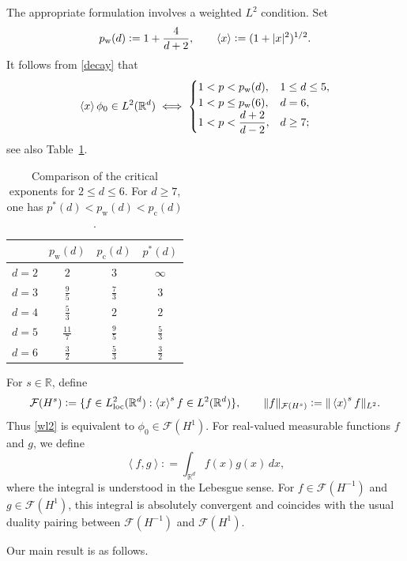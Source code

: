 \documentclass[12pt, a4paper, reqno]{amsart}
\numberwithin{equation}{section}
\theoremstyle{definition}
\theoremstyle{remark}
\newcommand{\R}{\mathbb R}
\newcommand{\cF}{\mathcal F}
\def\tbra[#1,#2]{{\left\langle #1,#2\right\rangle}}
\newcommand{\ce}{\mathrel{\mathop:}=}
\begin{document}
The appropriate formulation involves a weighted $L^2$ condition.
Set
\[
  p_{\mathrm w}(d)\ce1+\frac{4}{d+2},
  \qquad \braket{x}\ce(1+|x|^2)^{1/2}.
\]
It follows from \eqref{decay} that
\begin{align}
\label{wl2}
  \braket{x}\phi_0\in L^2(\R^d)
  \iff
  \begin{cases}
    1<p<p_{\mathrm w}(d), & 1\le d\le5,\\
    1<p\le p_{\mathrm w}(6), & d=6,\\
    1<p<\dfrac{d+2}{d-2}, & d\ge7;
  \end{cases}
\end{align}
see also Table~\ref{t-p}.
\begin{table}[t]
\centering
\begin{tabular}{c|ccc}
  & $p_{\mathrm w}(d)$ & $p_{\mathrm c}(d)$ & $p^*(d)$\\ \hline
  $d=2$ & $2$ & $3$ & $\infty$\\[1pt]
  $d=3$ & $\frac95$ & $\frac73$ & $3$\\[3pt]
  $d=4$ & $\frac53$ & $2$ & $2$\\[3pt]
  $d=5$ & $\frac{11}{7}$ & $\frac95$ & $\frac53$\\[3pt]
  $d=6$ & $\frac32$ & $\frac53$ & $\frac32$
\end{tabular}
\vspace{10pt}
\caption{Comparison of the critical exponents for $2\le d\le6$.
For $d\ge7$, one has $p^*(d)<p_{\mathrm w}(d)<p_{\mathrm c}(d)$.}
\label{t-p}
\end{table}
For $s\in\R$, define
\[
  \cF(H^s)
  \ce\{f\in L^2_{\mathrm{loc}}(\R^d):\braket{x}^sf\in L^2(\R^d)\},
  \qquad
  \|f\|_{\cF(H^s)}\ce\|\braket{x}^sf\|_{L^2}.
\]
Thus \eqref{wl2} is equivalent to $\phi_0\in\cF(H^1)$.
For real-valued measurable functions $f$ and $g$,
we define
\[
  \tbra[f,g]\ce\int_{\R^d}f(x)g(x)\,dx,
\]
where the integral is understood in the Lebesgue sense.
For $f\in\cF(H^{-1})$ and $g\in\cF(H^1)$, this integral is
absolutely convergent and coincides with the usual duality pairing
between $\cF(H^{-1})$ and $\cF(H^1)$.

Our main result is as follows.
\end{document}
